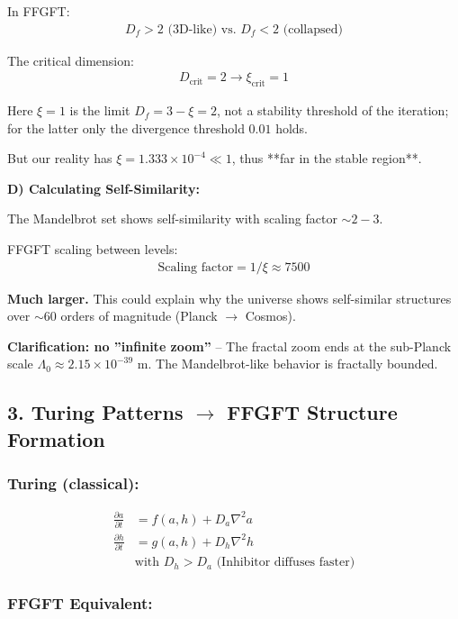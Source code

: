 	In FFGFT:
	\begin{align*}
		D_f > 2 \text{ (3D-like) vs. } D_f < 2 \text{ (collapsed)}
	\end{align*}
	
	The critical dimension:
	\begin{align*}
		D_{\text{crit}} = 2 \rightarrow \xi_{\text{crit}} = 1
	\end{align*}
	
	Here $\xi = 1$ is the limit $D_f = 3-\xi = 2$, not a stability threshold of the iteration; for the latter only the divergence threshold $0.01$ holds.
	
	But our reality has $\xi = 1.333 \times 10^{-4} \ll 1$, thus **far in the stable region**.
	
	\textbf{D) Calculating Self-Similarity:}
	
	The Mandelbrot set shows self-similarity with scaling factor $\sim 2-3$.
	
	FFGFT scaling between levels:
	\begin{align*}
		\text{Scaling factor} = 1/\xi \approx 7500
	\end{align*}
	
	\textbf{Much larger.} This could explain why the universe shows self-similar structures over $\sim 60$ orders of magnitude (Planck $\to$ Cosmos).
	
	\textbf{Clarification: no ''infinite zoom''} – The fractal zoom ends at the sub-Planck scale $\Lambda_0 \approx 2.15 \times 10^{-39}$ m. The Mandelbrot-like behavior is fractally bounded.
	
	\subsection*{3. Turing Patterns $\rightarrow$ FFGFT Structure Formation}
	
	\subsubsection*{Turing (classical):}
	\begin{align*}
		\frac{\partial a}{\partial t} &= f(a,h) + D_a \nabla^2 a \\
		\frac{\partial h}{\partial t} &= g(a,h) + D_h \nabla^2 h \\
		&\text{with } D_h > D_a \text{ (Inhibitor diffuses faster)}
	\end{align*}
	
	\subsubsection*{FFGFT Equivalent:}
	
